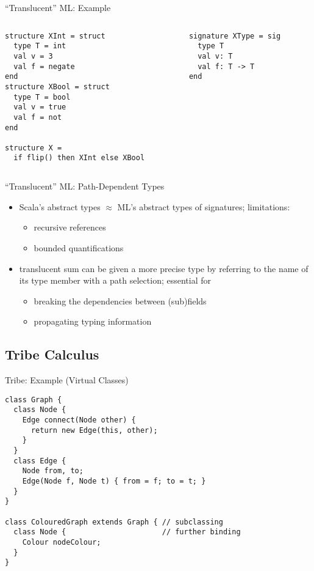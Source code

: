 \documentclass{beamer}
\begin{document}
\begin{frame}[fragile]{``Translucent'' ML: Example}
\begin{columns}
\begin{column}[t]{5cm}
\begin{verbatim}
structure XInt = struct
  type T = int
  val v = 3
  val f = negate
end
structure XBool = struct
  type T = bool
  val v = true
  val f = not
end

structure X =
  if flip() then XInt else XBool
\end{verbatim}
\end{column}
\begin{column}[t]{5cm}
\begin{verbatim}
signature XType = sig
  type T
  val v: T
  val f: T -> T
end
\end{verbatim}
\end{column}
\end{columns}
\end{frame}

\begin{frame}{``Translucent'' ML: Path-Dependent Types}
\begin{itemize}
\item Scala's abstract types  $\approx$ ML's abstract types of signatures; limitations:
\begin{itemize}
\item recursive references
\item bounded quantifications
\end{itemize}
\item translucent sum can be given a more precise type by referring to the name of its type member with a path selection; essential for %
\begin{itemize}
\item breaking the dependencies between (sub)fields
\item propagating typing information
\end{itemize}
\end{itemize}
\end{frame}

\subsection{Tribe Calculus}

\begin{frame}[fragile]{Tribe: Example (Virtual Classes)}
\begin{verbatim}
class Graph {
  class Node {
    Edge connect(Node other) {
      return new Edge(this, other);
    }
  }
  class Edge {
    Node from, to;
    Edge(Node f, Node t) { from = f; to = t; }
  }
}

class ColouredGraph extends Graph { // subclassing
  class Node {                      // further binding
    Colour nodeColour;
  }
}
\end{verbatim}
\end{frame}
\end{document}

